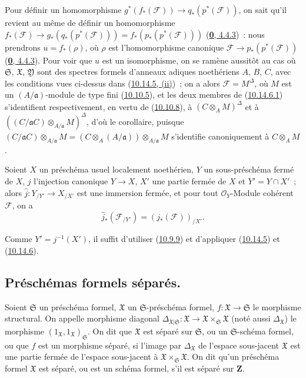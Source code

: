 Pour définir un homomorphisme
$g^*(f_*(\mathscr{F}))\to q_*(p^*(\mathscr{F}))$, on sait qu'il revient au
même de définir un homomorphisme
$f_*(\mathscr{F})\to g_*(q_*(p^*(\mathscr{F})))
=f_*(p_*(p^*(\mathscr{F})))$
(\hyperref[0.4.4.3-fr]{\textbf{0}, 4.4.3})~: nous prendrons $u=f_*(\rho)$, où $\rho$
est l'homomorphisme canonique
$\mathscr{F}\to p_*(p^*(\mathscr{F}))$
(\hyperref[0.4.4.3-fr]{\textbf{0}, 4.4.3}). Pour voir que $u$ est un isomorphisme, on
se ramène aussitôt au cas où $\mathfrak{S}$, $\mathfrak{X}$,
$\mathfrak{Y}$ sont des spectres formels d'anneaux adiques noethériens $A$,
$B$, $C$, avec les conditions vues ci-dessus dans
(\hyperref[I.10.14.5-fr]{10.14.5, (ii)})~; on a alors
$\mathscr{F}=M^\Delta$, où $M$ est un $(A/\mathfrak{a})$-module de type fini
(\hyperref[I.10.10.5-fr]{10.10.5}), et les deux membres de
(\hyperref[I.10.14.6.1-fr]{10.14.6.1}) s'identifient respectivement, en vertu
de (\hyperref[I.10.10.8-fr]{10.10.8}), à
$(C\otimes_A M)^\Delta$ et à
$((C/\mathfrak{a}C)\otimes_{A/\mathfrak{a}}M)^\Delta$, d'où le corollaire,
puisque
$(C/\mathfrak{a}C)\otimes_{A/\mathfrak{a}}M
=(C\otimes_A(A/\mathfrak{a}))\otimes_{A/\mathfrak{a}}M$ s'identifie
canoniquement à $C\otimes_A M$.

\begin{corollary}[10.14.7]
\label{I.10.14.7-fr}
Soient $X$ un préschéma usuel localement noethérien, $Y$ un sous-préschéma
fermé de $X$, $j$ l'injection canonique $Y\to X$, $X'$ une partie fermée de
$X$ et $Y'=Y\cap X'$~; alors
$\widehat{j}:Y_{/Y'}\to X_{/X'}$ est une immersion fermée, et pour tout
$\mathscr{O}_Y$-Module cohérent $\mathscr{F}$, on a
\[
  \widehat{j}_*(\mathscr{F}_{/Y'})=(j_*(\mathscr{F}))_{/X'}.
\]
\end{corollary}

Comme $Y'=j^{-1}(X')$, il suffit d'utiliser
(\hyperref[I.10.9.9-fr]{10.9.9}) et d'appliquer
(\hyperref[I.10.14.5-fr]{10.14.5}) et
(\hyperref[I.10.14.6-fr]{10.14.6}).

\subsection{Préschémas formels séparés.}
\label{subsection:I.10.15-fr}

\begin{definition}[10.15.1]
\label{I.10.15.1-fr}
Soient $\mathfrak{S}$ un préschéma formel, $\mathfrak{X}$ un
$\mathfrak{S}$-préschéma formel,
$f:\mathfrak{X}\to\mathfrak{S}$ le morphisme structural. On appelle
morphisme diagonal
$\Delta_{\mathfrak{X}|\mathfrak{S}}:\mathfrak{X}\to
\mathfrak{X}\times_{\mathfrak{S}}\mathfrak{X}$ (noté aussi
$\Delta_{\mathfrak{X}}$) le morphisme
$(1_{\mathfrak{X}},1_{\mathfrak{X}})_{\mathfrak{S}}$. On dit que
$\mathfrak{X}$ est séparé sur $\mathfrak{S}$, ou un
$\mathfrak{S}$-schéma formel, ou que $f$ est un morphisme séparé, si l'image
par $\Delta_{\mathfrak{X}}$ de l'espace sous-jacent $\mathfrak{X}$ est une
partie fermée de l'espace sous-jacent à
$\mathfrak{X}\times_{\mathfrak{S}}\mathfrak{X}$. On dit qu'un préschéma
formel $\mathfrak{X}$ est séparé, ou est un schéma formel, s'il est séparé
sur $\mathbf{Z}$.
\end{definition}

